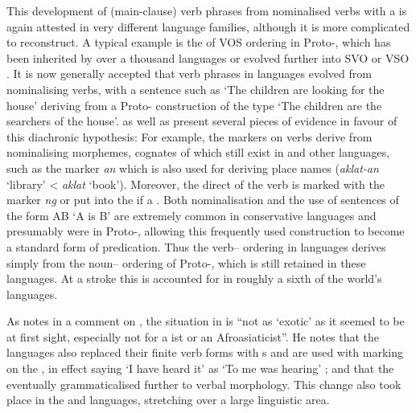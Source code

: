 \documentclass[output=paper]{langsci/langscibook}
\begin{document}
This development of (main-clause) verb phrases from nominalised verbs with a   is again attested in very different language families, although it is more complicated to reconstruct. A typical example is the  of VOS ordering in Proto-, which has been inherited by over a thousand  languages or evolved further into SVO or VSO \citep[7]{Adelaar2005}. It is now generally accepted that verb phrases in  languages evolved from nominalising verbs, with a sentence such as ‘The children are looking for the house’ deriving from a Proto- construction of the type ‘The children are the searchers of the house’. \citet{StarostaEtAl1982} as well as \citet{Kaufman2009} present several pieces of evidence in favour of this diachronic hypothesis: For example, the  markers on verbs derive from nominalising morphemes, cognates of which still exist in  and other languages, such as the   marker \textit{an} which is also used for deriving place names (\textit{aklat-an} ‘library’ < \textit{aklat} ‘book’). Moreover, the direct  of the verb is marked with the  marker \textit{ng} or put into the   if a . Both nominalisation and the use of  sentences of the form AB ‘A is B’ are extremely common in conservative  languages and presumably were in Proto-, allowing this frequently used construction to become a standard form of predication. Thus the verb– ordering in  languages derives simply from the noun– ordering of Proto-, which is still retained in these languages. At a stroke this  is accounted for in roughly a sixth of the world’s languages.

As \citet[167]{Sasse2009} notes in a comment on \citet{Kaufman2009}, the situation in  is “not as ‘exotic’ as it seemed to be at first sight, especially not for a ist or an Afroasiaticist”. He notes that the  languages also replaced their finite verb forms with s and are used with  marking on the , in effect saying ‘I have heard it’ as ‘To me was hearing’ \citep[174]{Sasse2009}; and that the   eventually grammaticalised further to  verbal morphology. This change also took place in the  and  languages, stretching over a large linguistic area. 
\end{document}

